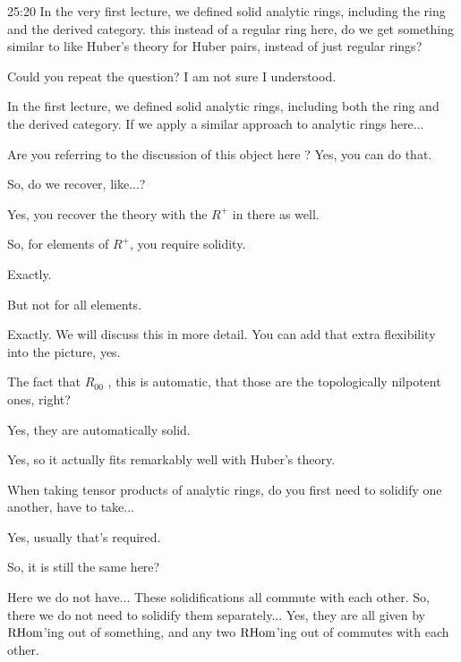 \begin{unfinished}{25:20}
\ques In the very first lecture, we defined solid analytic rings, including the ring and the derived category.  this instead of a regular ring here, do we get something similar to like Huber's theory for Huber pairs, instead of just regular rings? 

\ans Could you repeat the question? I am not sure I understood.

\ques In the first lecture, we defined solid analytic rings, including both the ring and the derived category. If we apply a similar approach to analytic rings here...

\ans Are you referring to the discussion of this object here ? Yes, you can do that. 

\ques So, do we recover, like...? 

\ans Yes, you recover the theory with the $R^+$ in there as well. 

\gabber So, for elements of $R^+$, you require solidity. 

\clausen Exactly.

\gabber But not for all elements.

\clausen Exactly. We will discuss this in more detail. You can add that extra flexibility into the picture, yes.

\gabber The fact that $R_{00}$ , this is automatic, that those are the topologically nilpotent ones, right?

\clausen Yes, they are automatically solid.


\clausen Yes, so it actually fits remarkably well with Huber's theory.

\ques When taking tensor products of analytic rings, do you first need to solidify one another, have to take... %

\clausen Yes, usually that's required.

\ques So, it is still the same here? 

\clausen Here we do not have... These  solidifications all commute with each other. So, there we do not need to solidify them separately... Yes, they are all given by $\operatorname{RHom}$'ing out of something, and any two $\operatorname{RHom}$'ing out of commutes with each other.


\end{unfinished}